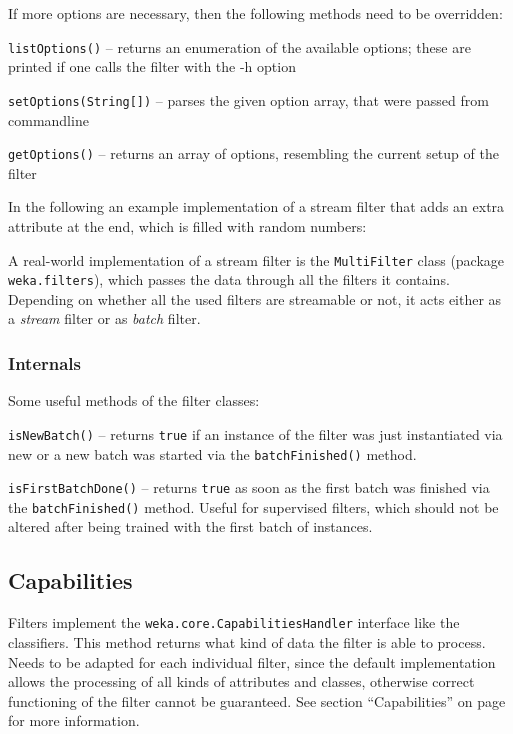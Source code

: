 If more options are necessary, then the following methods need to be overridden:
\begin{tight_itemize}
  \item \texttt{listOptions()} -- returns an enumeration of the available
options; these are printed if one calls the filter with the -h option
  \item \texttt{setOptions(String[])} -- parses the given option array,
that were passed from commandline
  \item \texttt{getOptions()} -- returns an array of options, resembling the
current setup of the filter
\end{tight_itemize}

\newpage
In the following an example implementation of a stream filter that adds an extra
attribute at the end, which is filled with random numbers:

{\footnotesize }

\noindent A real-world implementation of a stream filter is the
\texttt{MultiFilter} class (package \texttt{weka.filters}), which passes the
data through all the filters it contains. Depending on whether all the used
filters are streamable or not, it acts either as a \textit{stream} filter or as
\textit{batch} filter.

\newpage
\subsubsection{Internals}
Some useful methods of the filter classes:
\begin{tight_itemize}
  \item \texttt{isNewBatch()} -- returns \texttt{true} if an instance of the
filter was just instantiated via new or a new batch was started via the
\texttt{batchFinished()} method.
  \item \texttt{isFirstBatchDone()} -- returns \texttt{true} as soon as the
first batch was finished via the \texttt{batchFinished()} method. Useful for
supervised filters, which should not be altered after being trained with the
first batch of instances.
\end{tight_itemize}

\subsection{Capabilities}
\label{filter_capabilities}
Filters implement the \texttt{weka.core.CapabilitiesHandler} interface like the
classifiers. This method returns what kind of data the filter is able to
process. Needs to be adapted for each individual filter, since the default
implementation allows the processing of all kinds of attributes and classes,
otherwise correct functioning of the filter cannot be guaranteed. See section
``Capabilities'' on page \pageref{classifier_capabilities} for more information.

